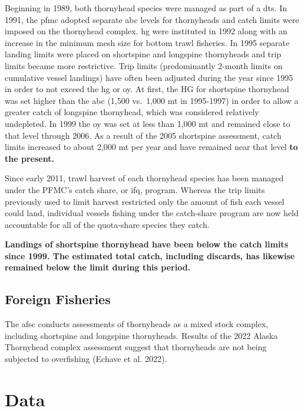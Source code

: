 \documentclass[11pt,
  english,
  letterpaper,
]{article}
\begin{document}
Beginning in 1989, both thornyhead species were managed as part of a \gls{dts}. In 1991, the \gls{pfmc} adopted separate \gls{abc} levels for thornyheads and catch limits were imposed on the thornyhead complex. \gls{hg} were instituted in 1992 along with an increase in the minimum mesh size for bottom trawl fisheries. In 1995 separate landing limits were placed on shortspine and longspine thornyheads and trip limits became more restrictive. Trip limits (predominantly 2-month limits on cumulative vessel landings) have often been adjusted during the year since 1995 in order to not exceed the \gls{hg} or \gls{oy}. At first, the HG for shortspine thornyhead was set higher than the \gls{abc} (1,500 vs.~1,000 mt in 1995-1997) in order to allow a greater catch of longspine thornyhead, which was considered relatively undepleted. In 1999 the \gls{oy} was set at less than 1,000 mt and remained close to that level through 2006. As a result of the 2005 shortspine assessment, catch limits increased to about 2,000 mt per year and have remained near that level \textbf{to the present.}

Since early 2011, trawl harvest of each thornyhead species has been managed under the PFMC's catch share, or \gls{ifq}, program. Whereas the trip limits previously used to limit harvest restricted only the amount of fish each vessel could land, individual vessels fishing under the catch-share program are now held accountable for all of the quota-share species they catch.

\textbf{Landings of shortspine thornyhead have been below the catch limits since 1999. The estimated total catch, including discards, has likewise remained below the limit during this period.}

\hypertarget{foreign-fisheries}{%
\subsection{Foreign Fisheries}\label{foreign-fisheries}}

The \gls{afsc} conducts assessments of thornyheads as a mixed stock complex, including shortspine and longspine thornyheads. Results of the 2022 Alaska Thornyhead complex assessment suggest that thornyheads are not being subjected to overfishing (Echave et al. 2022).

\hypertarget{data}{%
\section{Data}\label{data}}
\end{document}
